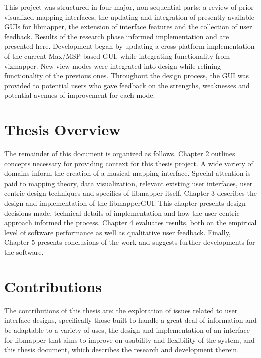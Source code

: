 This project was structured in four major, non-sequential parts: a review of prior visualized mapping interfaces, the updating and integration of presently available GUIs for libmapper, the extension of interface features and the collection of user feedback. Results of the research phase informed implementation and are presented here. Development began by updating a cross-platform implementation of the current Max/MSP-based GUI, while integrating functionality from vizmapper. New view modes were integrated into design while refining functionality of the previous ones. Throughout the design process, the GUI was provided to potential users who gave feedback on the strengths, weaknesses and potential avenues of improvement for each mode.

\section{Thesis Overview}

The remainder of this document is organized as follows. Chapter 2 outlines concepts necessary for providing context for this thesis project. A wide variety of domains inform the creation of a musical mapping interface. Special attention is paid to mapping theory, data visualization, relevant existing user interfaces, user centric design techniques and specifics of libmapper itself. Chapter 3 describes the design and implementation of the libmapperGUI. This chapter presents design decisions made, technical details of implementation and how the user-centric approach informed the process. Chapter 4 evaluates results, both on the empirical level of software performance as well as qualitative user feedback. Finally, Chapter 5 presents conclusions of the work and suggests further developments for the software.

\section{Contributions}

The contributions of this thesis are: the exploration of issues related to user interface designs, specifically those built to handle a great deal of information and be adaptable to a variety of uses, the design and implementation of an interface for libmapper that aims to improve on usability and flexibility of the system, and this thesis document, which describes the research and development therein.

